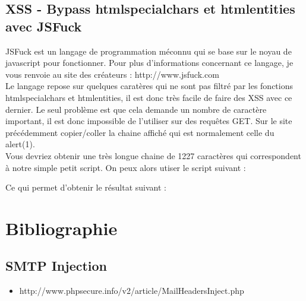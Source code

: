 \documentclass{article}
\begin{document}
\subsection{XSS - Bypass htmlspecialchars et htmlentities avec JSFuck}

JSFuck est un langage de programmation méconnu qui se base sur le noyau de javascript pour fonctionner. Pour plus d'informations concernant ce langage, je vous renvoie au site des créateurs : http://www.jsfuck.com\\
Le langage repose sur quelques caratères qui ne sont pas filtré par les fonctions htmlspecialchars et htmlentities, il est donc très facile de faire des XSS avec ce dernier. Le seul problème est que cela demande un nombre de caractère important, il est donc impossible de l'utiliser sur des requêtes GET. Sur le site précédemment copier/coller la chaine affiché qui est normalement celle du alert(1).\\

Vous devriez obtenir une très longue chaine de 1227 caractères qui correspondent à notre simple petit script. On peux alors utiser le script suivant :
\vspace{0.2cm}\\
\fbox{\parbox{\textwidth}{
javascript:[][(![]...et la suite de la chaine
}}
\vspace{0.2cm}
	
Ce qui permet d'obtenir le résultat suivant :
\vspace{0.2cm}\\
\vspace{0.2cm}

\newpage
\section{Bibliographie}
\subsection{SMTP Injection}
\begin{itemize}
\item http://www.phpsecure.info/v2/article/MailHeadersInject.php
\end{itemize}
\end{document}
